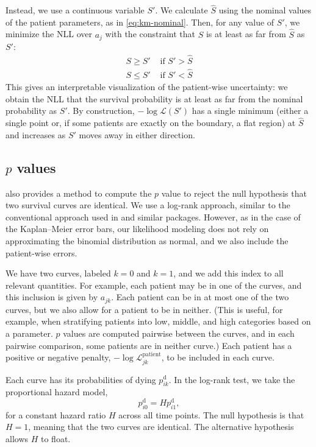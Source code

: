 \documentclass[article]{jss}
\newcommand{\KM}{Kaplan--Meier} %
\begin{document}
Instead, we use a continuous variable \(S'\). We calculate \(\hat{S}\) using the nominal values of the patient parameters, as in \cref{eq:km-nominal}. Then, for any value of \(S'\), we minimize the NLL over \(a_j\) with the constraint that \(S\) is at least as far from \(\hat{S}\) as \(S'\):
\begin{align}
S \ge S' & \text{ if } S' > \hat{S} \\
S \le S' & \text{ if } S' < \hat{S}
\end{align}
This gives an interpretable visualization of the patient-wise uncertainty: we obtain the NLL that the survival probability is at least as far from the nominal probability as \(S'\). By construction, \(-\log\mathcal{L}(S')\) has a single minimum (either a single point or, if some patients are exactly on the boundary, a flat region) at \(\hat{S}\) and increases as \(S'\) moves away in either direction.

\subsection[p values]{\(p\) values}

 also provides a method to compute the \(p\) value to reject the null hypothesis that two survival curves are identical. We use a log-rank approach, similar to the conventional approach used in  and similar packages. However, as in the case of the \KM{} error bars, our likelihood modeling does not rely on approximating the binomial distribution as normal, and we also include the patient-wise errors.

We have two curves, labeled \(k=0\) and \(k=1\), and we add this index to all relevant quantities. For example, each patient may be in one of the curves, and this inclusion is given by \(a_{jk}\). Each patient can be in at most one of the two curves, but we also allow for a patient to be in neither. (This is useful, for example, when stratifying patients into low, middle, and high categories based on a parameter\@. \(p\) values are computed pairwise between the curves, and in each pairwise comparison, some patients are in neither curve.)  Each patient has a positive or negative penalty, \(-\log\mathcal{L}_{jk}^\text{patient}\), to be included in each curve.

Each curve has its probabilities of dying \(p^\text{d}_{ik}\). In the log-rank test, we take the proportional hazard model,
\begin{equation}
p^\text{d}_{i0} = H p^\text{d}_{i1},
\label{eq:logrank-hazard}
\end{equation}
for a constant hazard ratio \(H\) across all time points. The null hypothesis is that \(H=1\), meaning that the two curves are identical. The alternative hypothesis allows \(H\) to float.
\end{document}
